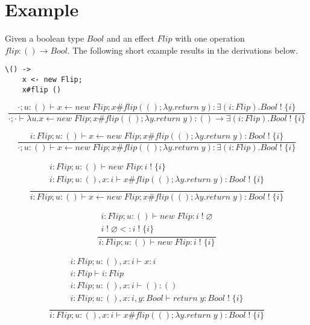 \documentclass[12pt]{article}
\newcommand\tunit[0]{()}
\newcommand\tarr[2]{#1 \rightarrow #2}
\newcommand\aty[2]{#1 \; ! \; #2}
\newcommand\texists[3]{\exists(#1:#2) . #3}
\newcommand\vunit[0]{()}
\newcommand\vabs[2]{\lambda #1 . #2}
\newcommand\creturn[1]{\textit{return} \; #1}
\newcommand\cdo[3]{#1 \leftarrow #2 ; #3}
\newcommand\copi[5]{#1 \# #2(#3 ; \lambda #4 . #5)}
\newcommand\cnew[1]{\textit{new} \; #1}
\newcommand\subty[2]{#1 <: #2}
\begin{document}
\section{Example}

Given a boolean type $Bool$ and an effect $Flip$ with one operation\\ $flip : \tarr{\tunit}{Bool}$.
The following short example results in the derivations below.

\begin{verbatim}
\() ->
	x <- new Flip;
	x#flip ()
\end{verbatim}

\[\frac{
	\cdot;u:\tunit \vdash \cdo{x}{\cnew{Flip}}{\copi{x}{flip}{\vunit}{y}{\creturn{y}}} :
	\texists{i}{Flip}{\aty{Bool}{\{i\}}}
}{
	\cdot;\cdot \vdash \vabs{u}{\cdo{x}{\cnew{Flip}}{\copi{x}{flip}{\vunit}{y}{\creturn{y}}}}
	: \tarr{\tunit}{\texists{i}{Flip}{\aty{Bool}{\{i\}}}}
}\]

\[
\frac{
	i:Flip;u:\tunit \vdash \cdo{x}{\cnew{Flip}}{\copi{x}{flip}{\vunit}{y}{\creturn{y}}} :
	\aty{Bool}{\{i\}}
	}{
	\cdot;u:\tunit \vdash \cdo{x}{\cnew{Flip}}{\copi{x}{flip}{\vunit}{y}{\creturn{y}}} :
	\texists{i}{Flip}{\aty{Bool}{\{i\}}}
	}
\]

\[\frac{
\begin{array}{l}
	i:Flip;u:\tunit \vdash \cnew{Flip} : \aty{i}{\{i\}} \\
	i:Flip;u:\tunit,x:i \vdash \copi{x}{flip}{\vunit}{y}{\creturn{y}} : \aty{Bool}{\{i\}} \\
\end{array}
}{
i:Flip;u:\tunit \vdash \cdo{x}{\cnew{Flip}}{\copi{x}{flip}{\vunit}{y}{\creturn{y}}} :
	\aty{Bool}{\{i\}}
}\]

\[\frac{
\begin{array}{l}
i:Flip;u:\tunit \vdash \cnew{Flip} : \aty{i}{\varnothing} \\
\subty{\aty{i}{\varnothing}}{\aty{i}{\{i\}}}
\end{array}
}{
i:Flip;u:\tunit \vdash \cnew{Flip} : \aty{i}{\{i\}}
}\]

\[\frac{
\begin{array}{l}
i:Flip;u:\tunit,x:i \vdash x : i \\
i:Flip \vdash i : Flip \\
i:Flip;u:\tunit,x:i \vdash \vunit : \tunit \\
i:Flip;u:\tunit,x:i,y:Bool \vdash \creturn{y} : \aty{Bool}{\{i\}} \\
\end{array}
}{
i:Flip;u:\tunit,x:i \vdash \copi{x}{flip}{\vunit}{y}{\creturn{y}} : \aty{Bool}{\{i\}}
}\]
\end{document}
